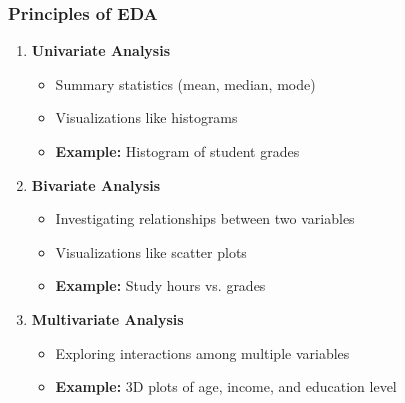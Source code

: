 \documentclass[aspectratio=169]{beamer}
\begin{document}
\begin{frame}
    \frametitle{Principles of EDA}
    \begin{enumerate}
        \item \textbf{Univariate Analysis}
            \begin{itemize}
                \item Summary statistics (mean, median, mode)
                \item Visualizations like histograms
                \item \textbf{Example:} Histogram of student grades
            \end{itemize}
        
        \item \textbf{Bivariate Analysis}
            \begin{itemize}
                \item Investigating relationships between two variables
                \item Visualizations like scatter plots
                \item \textbf{Example:} Study hours vs. grades
            \end{itemize}

        \item \textbf{Multivariate Analysis}
            \begin{itemize}
                \item Exploring interactions among multiple variables 
                \item \textbf{Example:} 3D plots of age, income, and education level
            \end{itemize}
    \end{enumerate}
\end{frame}
\end{document}

